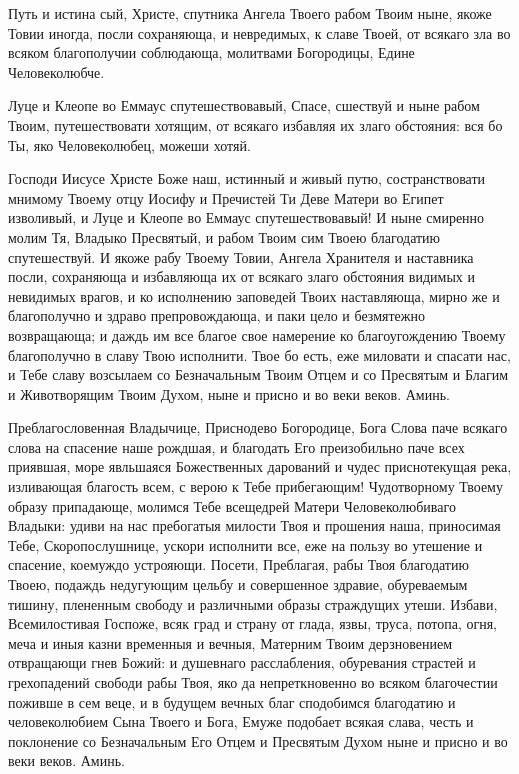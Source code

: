 \begin{mymulticols}





Путь и истина сый, Христе, спутника Ангела Твоего рабом Твоим ныне, якоже Товии иногда, посли сохраняюща, и невредимых, к славе Твоей, от всякаго зла во всяком благополучии соблюдающа, молитвами Богородицы, Едине Человеколюбче.




Луце и Клеопе во Еммаус спутешествовавый, Спасе, сшествуй и ныне рабом Твоим, путешествовати хотящим, от всякаго избавляя их злаго обстояния: вся бо Ты, яко Человеколюбец, можеши хотяй.




Господи Иисусе Христе Боже наш, истинный и живый путю, состранствовати мнимому Твоему отцу Иосифу и Пречистей Ти Деве Матери во Египет изволивый, и Луце и Клеопе во Еммаус спутешествовавый! И ныне смиренно молим Тя, Владыко Пресвятый, и рабом Твоим сим Твоею благодатию спутешествуй. И якоже рабу Твоему Товии, Ангела Хранителя и наставника посли, сохраняюща и избавляюща их от всякаго злаго обстояния видимых и невидимых врагов, и ко исполнению заповедей Твоих наставляюща, мирно же и благополучно и здраво препровождающа, и паки цело и безмятежно возвращающа; и даждь им все благое свое намерение ко благоугождению Твоему благополучно в славу Твою исполнити. Твое бо есть, еже миловати и спасати нас, и Тебе славу возсылаем со Безначальным Твоим Отцем и со Пресвятым и Благим и Животворящим Твоим Духом, ныне и присно и во веки веков. Аминь.




Преблагословенная Владычице, Приснодево Богородице, Бога Слова паче всякаго слова на спасение наше рождшая, и благодать Его преизобильно паче всех приявшая, море явльшаяся Божественных дарований и чудес приснотекущая река, изливающая благость всем, с верою к Тебе прибегающим! Чудотворному Твоему образу припадающе, молимся Тебе всещедрей Матери Человеколюбиваго Владыки: удиви на нас пребогатыя милости Твоя и прошения наша, приносимая Тебе, Скоропослушнице, ускори исполнити все, еже на пользу во утешение и спасение, коемуждо устрояющи. Посети, Преблагая, рабы Твоя благодатию Твоею, подаждь недугующим цельбу и совершенное здравие, обуреваемым тишину, плененным свободу и различными образы страждущих утеши. Избави, Всемилостивая Госпоже, всяк град и страну от глада, язвы, труса, потопа, огня, меча и иныя казни временныя и вечныя, Матерним Твоим дерзновением отвращающи гнев Божий: и душевнаго расслабления, обуревания страстей и грехопадений свободи рабы Твоя, яко да непреткновенно во всяком благочестии поживше в сем веце, и в будущем вечных благ сподобимся благодатию и человеколюбием Сына Твоего и Бога, Емуже подобает всякая слава, честь и поклонение со Безначальным Его Отцем и Пресвятым Духом ныне и присно и во веки веков. Аминь.

\end{mymulticols}

